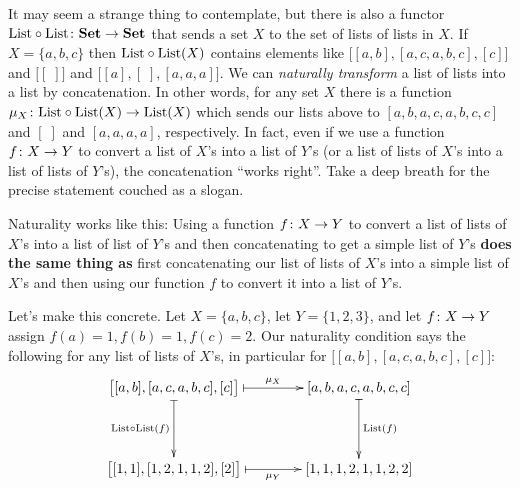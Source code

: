 \documentclass[CT4S-EN-RU]{subfiles}
\begin{document}
\begin{blockENG}
It may seem a strange thing to contemplate, but there is also a functor $\textnormal{List}\circ\textnormal{List}\colon{\bf Set}\rightarrow{\bf Set}$ that sends a set $X$ to the set of lists of lists in $X$. If $X=\{a,b,c\}$ then $\textnormal{List}\circ\textnormal{List}(X)$ contains elements like $\big[[a,b],[a,c,a,b,c],[c]\big]$ and $\big[[\;]\big]$ and $\big[[a],[\;],[a,a,a]\big]$. We can {\em naturally transform} a list of lists into a list by concatenation. In other words, for any set $X$ there is a function $\mu_X\colon\textnormal{List}\circ\textnormal{List}(X)\rightarrow\textnormal{List}(X)$ which sends our lists above to $[a,b,a,c,a,b,c,c]$ and $[\;]$ and $[a,a,a,a]$, respectively. In fact, even if we use a function $f\colon X\rightarrow Y$ to convert a list of $X$'s into a list of $Y$'s (or a list of lists of $X$'s into a list of lists of $Y$'s), the concatenation “works right”. Take a deep breath for the precise statement couched as a slogan.
\end{blockENG}

\begin{blockRUS}
\end{blockRUS}

\begin{sloganENG}
Naturality works like this: Using a function $f\colon X\rightarrow Y$ to convert a list of lists of $X$'s into a list of list of $Y$'s and then concatenating to get a simple list of $Y$'s {\bf does the same thing as} first concatenating our list of lists of $X$'s into a simple list of $X$'s and then using our function $f$ to convert it into a list of $Y$'s.
\end{sloganENG}

\begin{sloganRUS}
\end{sloganRUS}

\begin{blockENG}
Let's make this concrete. Let $X=\{a,b,c\}$, let $Y=\{1,2,3\}$, and let $f\colon X\rightarrow Y$ assign $f(a)=1, f(b)=1, f(c)=2$. Our naturality condition says the following for any list of lists of $X$'s, in particular for $\big[[a,b],[a,c,a,b,c],[c]\big]$:
$$\xymatrix@=40pt{
\big[[a,b],[a,c,a,b,c],[c]\big]\ar@{|->}[r]^-{\mu_X}\ar@{|->}[d]_{\List\circ\List(f)}&[a,b,a,c,a,b,c,c]\ar@{|->}[d]^{\List(f)}\\
\big[[1,1],[1,2,1,1,2],[2]\big]\ar@{|->}[r]_-{\mu_Y}&[1,1,1,2,1,1,2,2]
}
$$
\end{blockENG}

\begin{blockRUS}
\end{blockRUS}
\end{document}
